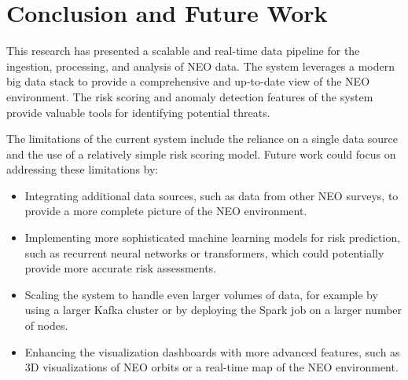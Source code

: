 \documentclass{article}
\begin{document}
\section{Conclusion and Future Work}

This research has presented a scalable and real-time data pipeline for the ingestion, processing, and analysis of NEO data. The system leverages a modern big data stack to provide a comprehensive and up-to-date view of the NEO environment. The risk scoring and anomaly detection features of the system provide valuable tools for identifying potential threats.

The limitations of the current system include the reliance on a single data source and the use of a relatively simple risk scoring model. Future work could focus on addressing these limitations by:

\begin{itemize}
    \item Integrating additional data sources, such as data from other NEO surveys, to provide a more complete picture of the NEO environment.
    \item Implementing more sophisticated machine learning models for risk prediction, such as recurrent neural networks or transformers, which could potentially provide more accurate risk assessments.
    \item Scaling the system to handle even larger volumes of data, for example by using a larger Kafka cluster or by deploying the Spark job on a larger number of nodes.
    \item Enhancing the visualization dashboards with more advanced features, such as 3D visualizations of NEO orbits or a real-time map of the NEO environment.
\end{itemize}

\printbibliography
\end{document}
